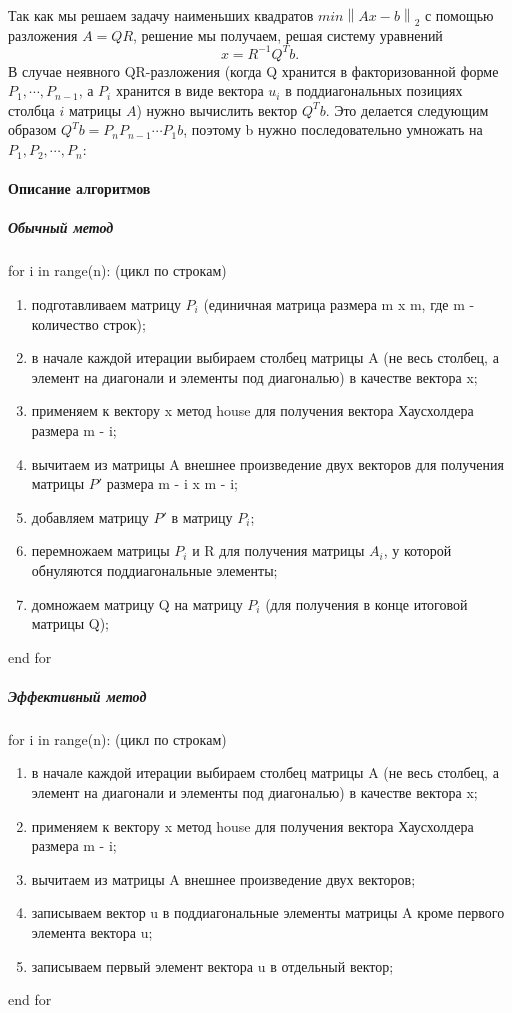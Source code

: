 \documentclass[a4paper]{article}
\begin{document}
Так как мы решаем задачу наименьших квадратов $min\left \| Ax-b \right \|_2$ с помощью разложения $A = QR$, решение мы получаем, решая систему уравнений
\begin{equation*}
x = R^{-1} Q^T b.
\end{equation*}
В случае неявного QR-разложения (когда Q хранится в факторизованной форме $P_1, \cdots, P_{n-1}$, а $P_i$ хранится в виде вектора $u_i$ в поддиагональных позициях столбца $i$ матрицы $A$) нужно вычислить вектор $Q^Tb$. Это делается следующим образом $Q^T b = P_n P_{n-1}\cdots P_1 b$, поэтому b нужно последовательно умножать на $P_1, P_2, \cdots, P_n$:

\newpage

\paragraph{Описание алгоритмов}

\subparagraph{Обычный метод}

for i in range(n): (цикл по строкам)
\begin{enumerate}
\item подготавливаем матрицу $P_i$ (единичная матрица размера m x m, где m - количество строк);
\item в начале каждой итерации выбираем столбец матрицы A (не весь столбец, а элемент на диагонали и элементы под диагональю) в качестве вектора x;
\item применяем к вектору x метод house для получения вектора Хаусхолдера размера m - i;
\item вычитаем из матрицы A внешнее произведение двух векторов для получения матрицы ${P}'$ размера m - i x m - i;
\item добавляем матрицу ${P}'$ в матрицу $P_i$;
\item перемножаем матрицы $P_i$ и R для получения матрицы $A_i$, у которой обнуляются поддиагональные элементы;
\item домножаем матрицу Q на матрицу $P_i$ (для получения в конце итоговой матрицы Q);
\end{enumerate}
end for

\subparagraph{Эффективный метод}


for i in range(n): (цикл по строкам)
\begin{enumerate}
\item в начале каждой итерации выбираем столбец матрицы A (не весь столбец, а элемент на диагонали и элементы под диагональю) в качестве вектора x;
\item применяем к вектору x метод house для получения вектора Хаусхолдера размера m - i;
\item вычитаем из матрицы A внешнее произведение двух векторов;
\item записываем вектор u в поддиагональные элементы матрицы A кроме первого элемента вектора u;
\item записываем первый элемент вектора u в отдельный вектор;
\end{enumerate}
end for
\end{document}
